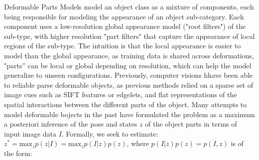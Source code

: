 \documentclass[10pt,onecolumn,letterpaper]{article}
\begin{document}
\begin{enumerate}
Deformable Parts Models model an object class as a mixture of components, each being responsible for modeling the appearance of an object sub-category. Each component uses a low-resolution global appearance model ("root filters") of the sub-type, with higher resolution "part filters" that capture the appearance of local regions of the sub-type. The intuition is that the local appearance is easier to model than the global appearance, as training data is shared across deformations, "parts” can be local or global depending on resolution, which can help the model generalize to unseen configurations. Previously, computer visions hhave been able to reliable parse deformable objects, as previous methods relied on a sparse set of image cues such as SIFT features or edgelets, and flat representations of the spatial interactions between the different parts of the object. Many attempts to model deformable bojects in the past have formulated the problem as a maximum a posteriori inference of the pose and states $z$ of the object parts in terms of input image data $I$. Formally, we seek to estimate: $z^{*} = \text{max}_z p(z|I) = \text{max}_zp(I|z)p(z)$, where $p(I|z)p(z) = p(I,z)$ is of the form:


\end{enumerate}
\end{document}
